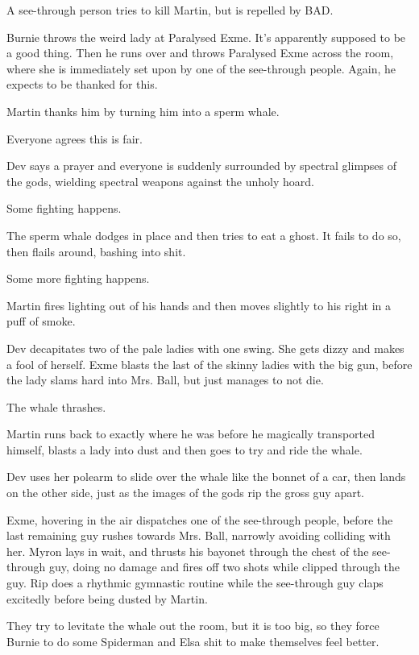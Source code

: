 A see-through person tries to kill Martin, but is repelled by BAD.\medskip

Burnie throws the weird lady at Paralysed Exme. It’s apparently supposed to be a good thing. Then he runs over and throws Paralysed Exme across the room, where she is immediately set upon by one of the see-through people. Again, he expects to be thanked for this.\medskip

Martin thanks him by turning him into a sperm whale.\medskip

Everyone agrees this is fair.\medskip

Dev says a prayer and everyone is suddenly surrounded by spectral glimpses of the gods, wielding spectral weapons against the unholy hoard.\medskip

Some fighting happens.\medskip

The sperm whale dodges in place and then tries to eat a ghost. It fails to do so, then flails around, bashing into shit.\medskip

Some more fighting happens.\medskip

Martin fires lighting out of his hands and then moves slightly to his right in a puff of smoke.\medskip

Dev decapitates two of the pale ladies with one swing. She gets dizzy and makes a fool of herself. Exme blasts the last of the skinny ladies with the big gun, before the lady slams hard into Mrs. Ball, but just manages to not die.\medskip

The whale thrashes.\medskip

Martin runs back to exactly where he was before he magically transported himself, blasts a lady into dust and then goes to try and ride the whale.\medskip

Dev uses her polearm to slide over the whale like the bonnet of a car, then lands on the other side, just as the images of the gods rip the gross guy apart.\medskip

Exme, hovering in the air dispatches one of the see-through people, before the last remaining guy rushes towards Mrs. Ball, narrowly avoiding colliding with her. Myron lays in wait, and thrusts his bayonet through the chest of the see-through guy, doing no damage and fires off two shots while clipped through the guy. Rip does a rhythmic gymnastic routine while the see-through guy claps excitedly before being dusted by Martin.\medskip

They try to levitate the whale out the room, but it is too big, so they force Burnie to do some Spiderman and Elsa shit to make themselves feel better.\medskip

